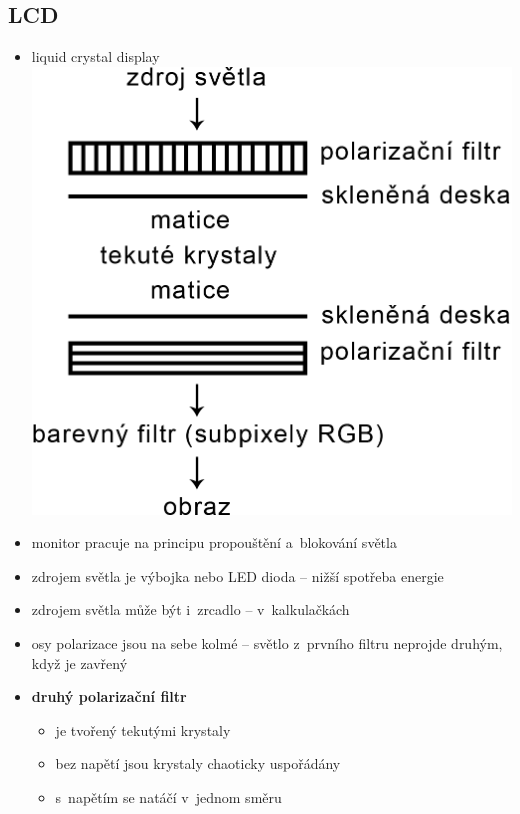 \documentclass[a4paper,12pt]{article}
\providecommand{\tightlist}{%
\setlength{\itemsep}{0pt}\setlength{\parskip}{0pt}}
\begin{document}
\subsection{LCD}

\begin{itemize}
  \tightlist
  \item liquid crystal display
  \includegraphics{ref/lcd.png}
  \item monitor pracuje na principu propouštění a~blokování světla
  \item zdrojem světla je výbojka nebo LED dioda -- nižší spotřeba energie
  \item zdrojem světla může být i~zrcadlo -- v~kalkulačkách
  \item osy polarizace jsou na sebe kolmé -- světlo z~prvního filtru neprojde
  druhým, když je zavřený
  \item \textbf{druhý polarizační filtr}
  \begin{itemize}
    \tightlist
    \item je tvořený tekutými krystaly
    \item bez napětí jsou krystaly chaoticky uspořádány
    \item s~napětím se natáčí v~jednom směru
  \end{itemize}


\end{itemize}
\end{document}
